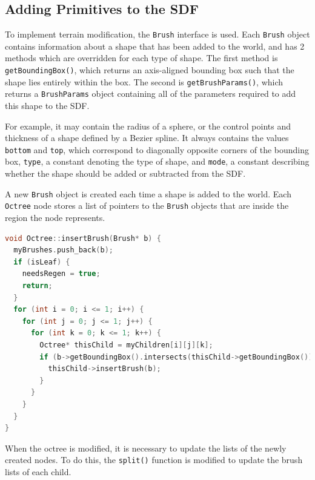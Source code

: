 \documentclass[11pt]{article}
\begin{document}
\subsection{Adding Primitives to the SDF}
\label{section:modification_implementation}

To implement terrain modification, the \texttt{Brush} interface is used. Each \texttt{Brush} object contains information about a shape that has been added to the world, and has 2 methods which are overridden for each type of shape. The first method is \texttt{getBoundingBox()}, which returns an axis-aligned bounding box such that the shape lies entirely within the box. The second is \texttt{getBrushParams()}, which returns a \texttt{BrushParams} object containing all of the parameters required to add this shape to the SDF. 

For example, it may contain the radius of a sphere, or the control points and thickness of a shape defined by a Bezier spline. It always contains the values \texttt{bottom} and \texttt{top}, which correspond to diagonally opposite corners of the bounding box, \texttt{type}, a constant denoting the type of shape, and \texttt{mode}, a constant describing whether the shape should be added or subtracted from the SDF.

A new \texttt{Brush} object is created each time a shape is added to the world. Each \texttt{Octree} node stores a list of pointers to the \texttt{Brush} objects that are inside the region the node represents. 

\begin{lstlisting}[language=C++,label={edit_add},caption={Code to add a new brush into the octree. The brush is added recursively to lists at all levels, so each leaf has a list of exactly the brushes that are partially inside it. The flag \texttt{needsRegen} indicates that the geometry within the chunk has changed.}]
void Octree::insertBrush(Brush* b) {
  myBrushes.push_back(b);
  if (isLeaf) {
    needsRegen = true;
    return;
  }
  for (int i = 0; i <= 1; i++) {
    for (int j = 0; j <= 1; j++) {
      for (int k = 0; k <= 1; k++) {
        Octree* thisChild = myChildren[i][j][k];
        if (b->getBoundingBox().intersects(thisChild->getBoundingBox())) {
          thisChild->insertBrush(b);
        }
      }
    }
  }
}
\end{lstlisting}

When the octree is modified, it is necessary to update the lists of the newly created nodes. To do this, the \texttt{split()} function is modified to update the brush lists of each child.
\end{document}
